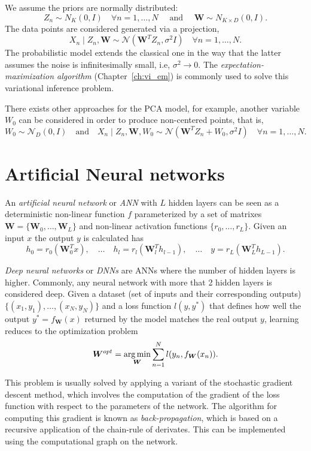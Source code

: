 We assume the priors are normally distributed:
\[
  Z_{n} \sim N_{K}(0, I) \quad \forall n =1,\dots,N \quad \text{ and } \quad \bm{W} \sim N_{K\times D}(0, I).
\]
The data points are considered generated via a projection,
\[
  X_{n} \mid Z_{n}, \bm{W} \sim \mathcal{N}(\bm{W}^{T}Z_{n}, \sigma^{2}I)\quad \forall n = 1,\dots, N.
\]
The probabilistic model extends the classical one in the way that the latter assumes the noise is infinitesimally small, i.e, \(\sigma^{2} \to 0\). The \emph{expectation-maximization algorithm} (Chapter~\ref{ch:vi_em}) is commonly used to solve this variational inference problem.

There exists other approaches for the PCA model, for example, another variable \(W_{0}\) can be considered in order to produce non-centered points, that is,
\[
  W_{0} \sim \mathcal{N}_{D}(0, I) \quad \text{and} \quad   X_{n} \mid Z_{n}, \bm{W}, W_{0} \sim \mathcal{N}(\bm{W}^{T}Z_{n} + W_{0}, \sigma^{2}I)\quad \forall n = 1,\dots, N.
\]

\section{Artificial Neural networks}

An \emph{artificial neural network} or \emph{ANN} with \(L\) hidden layers can be seen as a deterministic non-linear function \(f\) parameterized by a set of matrixes \(\bm{W} = \{\bm{W}_{0},\dots, \bm{W}_{L}\}\) and non-linear activation functions \(\{r_{0},\dots, r_{L}\}\). Given an input \(x\) the output \(y\) is calculated has
\[
  h_{0} = r_{0}(\bm{W}^{T}_{0}x), \quad \dots \quad h_{l} = r_{l}(\bm{W}_{l}^{T}h_{l-1}), \quad \dots \quad y = r_{L}(\bm{W}_{L}^{T}h_{L-1}).
\]

\emph{Deep neural networks} or \emph{DNNs} are ANNs where the number of hidden layers is higher. Commonly, any neural network with more that 2 hidden layers is considered deep. Given a dataset (set of inputs and their corresponding outputs) \(\{(x_{1}, y_{1}), \dots, (x_{N}, y_{N})\}\) and a loss function \(l(y,y^{*})\) that defines how well the output \(y^{*} = f_{\bm{W}}(x)\)  returned by the model matches the real output \(y\), learning reduces to the optimization problem
\[
  \bm{W}^{opt} = \operatorname*{arg\,min}_{\bm{W}} \sum_{n=1}^{N}l(y_{n}, f_{\bm{W}}(x_{n})).
\]

This problem is usually solved by applying a variant of the stochastic gradient descent method, which involves the computation of the gradient of the loss function with respect to the parameters of the network. The algorithm for computing this gradient is known as \emph{back-propagation}, which is based on a recursive application of the chain-rule of derivates. This can be implemented using the computational graph on the network.

